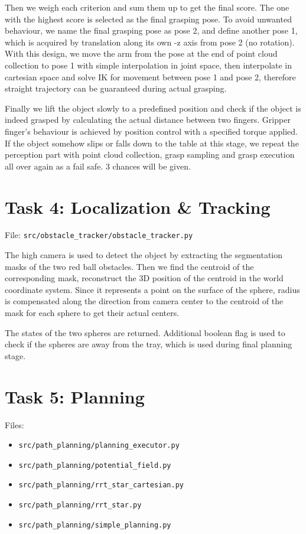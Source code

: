 \documentclass[
	english,
	accentcolor=11d,%
	type=intern,
	marginpar=false,
    logofile=media/PEARLTUDA.png
	]{tudapub}
\let\code\texttt
\begin{document}
Then we weigh each criterion and sum them up to get the final score. The one with the highest score is selected as the final grasping pose. To avoid unwanted behaviour, we name the final grasping pose as pose 2, and define another pose 1, which is acquired by translation along its own -z axis from pose 2 (no rotation). With this design, we move the arm from the pose at the end of point cloud collection to pose 1 with simple interpolation in joint space, then interpolate in cartesian space and solve IK for movement between pose 1 and pose 2, therefore straight trajectory can be guaranteed during actual grasping.

Finally we lift the object slowly to a predefined position and check if the object is indeed grasped by calculating the actual distance between two fingers. Gripper finger's behaviour is achieved by position control with a specified torque applied. If the object somehow slips or falls down to the table at this stage, we repeat the perception part with point cloud collection, grasp sampling and grasp execution all over again as a fail safe. 3 chances will be given. 

\section{Task 4: Localization \& Tracking}
File: \code{src/obstacle\_tracker/obstacle\_tracker.py}

The high camera is used to detect the object by extracting the segmentation masks of the two red ball obstacles. Then we find the centroid of the corresponding mask, reconstruct the 3D position of the centroid in the world coordinate system. Since it represents a point on the surface of the sphere, radius is compensated along the direction from camera center to the centroid of the mask for each sphere to get their actual centers.

The states of the two spheres are returned. Additional boolean flag is used to check if the spheres are away from the tray, which is used during final planning stage.

\section{Task 5: Planning}
Files: 
\begin{itemize}
\item \code{src/path\_planning/planning\_executor.py}
\item \code{src/path\_planning/potential\_field.py}
\item \code{src/path\_planning/rrt\_star\_cartesian.py}
\item \code{src/path\_planning/rrt\_star.py}
\item \code{src/path\_planning/simple\_planning.py}
\end{itemize}
\end{document}
